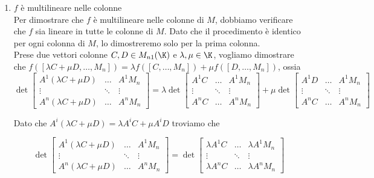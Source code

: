 \documentclass[11pt, a4paper, titlepage, oneside]{scrbook}
\begin{document}
\begin{enumerate}[label=\arabic*°]
    \item $f$ è multilineare nelle colonne \\
    Per dimostrare che $f$ è multilineare nelle colonne di $M$, dobbiamo verificare che $f$ sia lineare in tutte le colonne di $M$. Dato che il procedimento è identico per ogni colonna di $M$, lo dimostreremo solo per la prima colonna.  \\
    Prese due vettori colonne $C,D \in M_{n1}(\K)$ e $\lambda, \mu \in \K$, vogliamo dimostrare che \mbox{$f([\lambda C + \mu D, \ldots, M_n]) = \lambda f([C, \ldots, M_n]) + \mu f([D, \ldots, M_n])$}, ossia
    \[ \det
    \begin{bmatrix}
        A^1 (\lambda C + \mu D) & \dots & A^1 M_n \\
        \vdots & \ddots & \vdots \\
        A^n(\lambda C + \mu D) & \dots & A^n M_n
    \end{bmatrix} = \lambda \det \begin{bmatrix}
        A^1 C & \dots & A^1 M_n \\
        \vdots & \ddots & \vdots \\
        A^n C & \dots & A^n M_n
    \end{bmatrix}
    + \mu \det \begin{bmatrix}
        A^1 D & \dots & A^1 M_n \\
        \vdots & \ddots & \vdots \\
        A^n C & \dots & A^n M_n
    \end{bmatrix}
    \]

Dato che $A^i (\lambda C + \mu D) = \lambda A^i C + \mu A^i D$ troviamo che

    \[ \det
    \begin{bmatrix}
        A^1 (\lambda C + \mu D) & \dots & A^1 M_n \\
        \vdots & \ddots & \vdots \\
        A^n(\lambda C + \mu D) & \dots & A^n M_n
    \end{bmatrix} = \det \begin{bmatrix}
        \lambda A^1 C & \dots & \lambda A^1 M_n \\
        \vdots & \ddots & \vdots \\
        \lambda A^n C & \dots & \lambda A^n M_n
    \end{bmatrix}
    \]


\end{enumerate}
\end{document}
